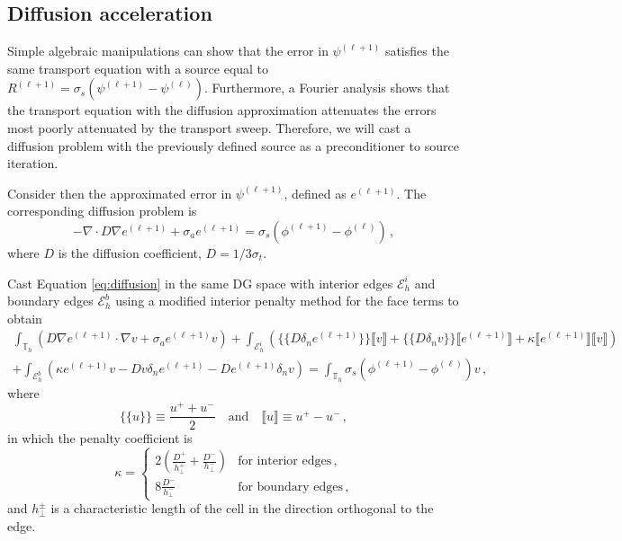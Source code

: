 \documentclass{article}
\begin{document}
\subsection{Diffusion acceleration}

Simple algebraic manipulations can show that the error in $\psi^{(\ell + 1)}$ satisfies the same transport equation with a source equal to $R^{(\ell + 1)} = \sigma_s (\psi^{(\ell + 1)} - \psi^{(\ell)})$. Furthermore, a Fourier analysis shows that the transport equation with the diffusion approximation attenuates the errors most poorly attenuated by the transport sweep. Therefore, we will cast a diffusion problem with the previously defined source as a preconditioner to source iteration.
	
Consider then the approximated error in $\psi^{(\ell + 1)}$, defined as $e^{(\ell + 1)}$. The corresponding diffusion problem is
\begin{equation}
	\label{eq:diffusion}
	- \nabla \cdot D \nabla e^{(\ell + 1)} + \sigma_a e^{(\ell + 1)} = \sigma_s (\phi^{(\ell + 1)} - \phi^{(\ell)})\,,
\end{equation}
where $D$ is the diffusion coefficient, $D = 1 / 3 \sigma_t$.

Cast Equation \eqref{eq:diffusion} in the same DG space with interior edges $\mathcal{E}_h^i$ and boundary edges $\mathcal{E}_h^b$ using a modified interior penalty method for the face terms to obtain
\begin{multline}
	\int_{\mathbb{T}_h} (D \nabla e^{(\ell + 1)} \cdot \nabla v + \sigma_a e^{(\ell + 1)} v) + \int_{\mathcal{E}_h^i} \left( \{\!\!\{ D \delta_n e^{(\ell + 1)} \}\!\!\} \llbracket v \rrbracket + \{\!\!\{ D \delta_n v \}\!\!\} \llbracket e^{(\ell + 1)} \rrbracket + \kappa \llbracket e^{(\ell + 1)} \rrbracket \llbracket v \rrbracket \right) \\
	+ \int_{\mathcal{E}_h^b} \left( \kappa e^{(\ell + 1)} v - D v \delta_n e^{(\ell + 1)} - D e^{(\ell + 1)} \delta_n v \right) = \int_{\mathbb{T}_h} \sigma_s (\phi^{(\ell + 1)} - \phi^{(\ell)}) v\,,
\end{multline}
	where
\[
	\{\!\!\{ u \}\!\!\} \equiv \frac{u^+ + u^-}{2} \quad \text{and} \quad \llbracket u \rrbracket \equiv u^+ - u^-\,,
\]
in which the penalty coefficient is
\[
	\kappa = \begin{cases} 2 \left(\frac{D^+}{h^+_\bot} + \frac{D^-}{h^-_\bot}\right) & \text{for~interior~edges}\,, \\ 8 \frac{D^-}{h^-_\bot} & \text{for~boundary~edges}\,, \end{cases}
\]
and $h^\pm_\bot$ is a characteristic length of the cell in the direction orthogonal to the edge.
\end{document}
